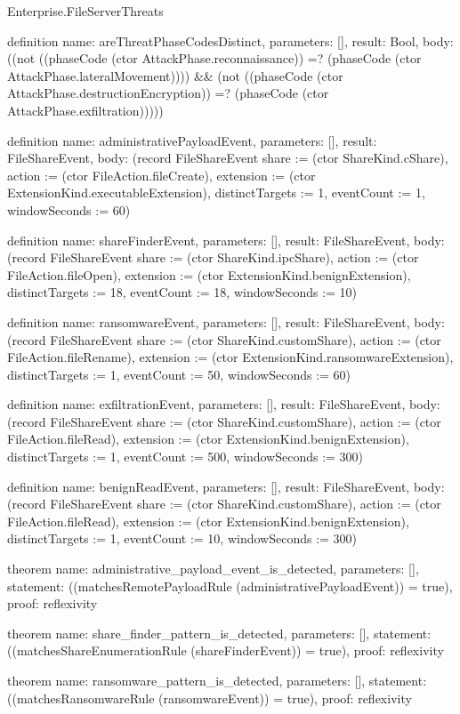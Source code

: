 \begin{lexlean}{Enterprise.FileServerThreats}
\begin{semanticmodule}
definition{
  name: areThreatPhaseCodesDistinct,
  parameters: [],
  result: Bool,
  body: ((not ((phaseCode (ctor AttackPhase.reconnaissance)) =? (phaseCode (ctor AttackPhase.lateralMovement)))) && (not ((phaseCode (ctor AttackPhase.destructionEncryption)) =? (phaseCode (ctor AttackPhase.exfiltration)))))
}

definition{
  name: administrativePayloadEvent,
  parameters: [],
  result: FileShareEvent,
  body: (record FileShareEvent {share := (ctor ShareKind.cShare), action := (ctor FileAction.fileCreate), extension := (ctor ExtensionKind.executableExtension), distinctTargets := 1, eventCount := 1, windowSeconds := 60})
}

definition{
  name: shareFinderEvent,
  parameters: [],
  result: FileShareEvent,
  body: (record FileShareEvent {share := (ctor ShareKind.ipcShare), action := (ctor FileAction.fileOpen), extension := (ctor ExtensionKind.benignExtension), distinctTargets := 18, eventCount := 18, windowSeconds := 10})
}

definition{
  name: ransomwareEvent,
  parameters: [],
  result: FileShareEvent,
  body: (record FileShareEvent {share := (ctor ShareKind.customShare), action := (ctor FileAction.fileRename), extension := (ctor ExtensionKind.ransomwareExtension), distinctTargets := 1, eventCount := 50, windowSeconds := 60})
}

definition{
  name: exfiltrationEvent,
  parameters: [],
  result: FileShareEvent,
  body: (record FileShareEvent {share := (ctor ShareKind.customShare), action := (ctor FileAction.fileRead), extension := (ctor ExtensionKind.benignExtension), distinctTargets := 1, eventCount := 500, windowSeconds := 300})
}

definition{
  name: benignReadEvent,
  parameters: [],
  result: FileShareEvent,
  body: (record FileShareEvent {share := (ctor ShareKind.customShare), action := (ctor FileAction.fileRead), extension := (ctor ExtensionKind.benignExtension), distinctTargets := 1, eventCount := 10, windowSeconds := 300})
}

theorem{
  name: administrative_payload_event_is_detected,
  parameters: [],
  statement: ((matchesRemotePayloadRule (administrativePayloadEvent)) = true),
  proof: reflexivity{}
}

theorem{
  name: share_finder_pattern_is_detected,
  parameters: [],
  statement: ((matchesShareEnumerationRule (shareFinderEvent)) = true),
  proof: reflexivity{}
}

theorem{
  name: ransomware_pattern_is_detected,
  parameters: [],
  statement: ((matchesRansomwareRule (ransomwareEvent)) = true),
  proof: reflexivity{}
}


\end{semanticmodule}
\end{lexlean}
